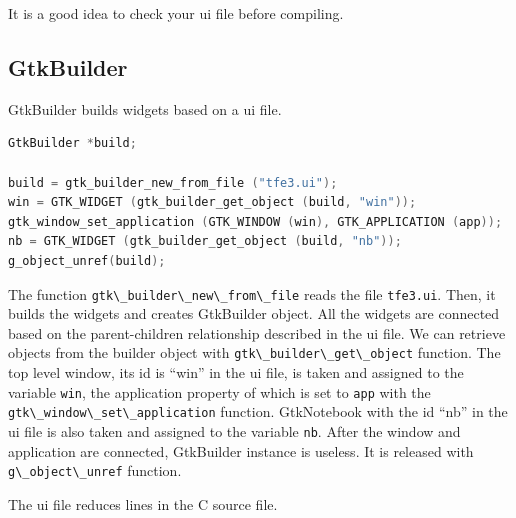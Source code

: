 It is a good idea to check your ui file before compiling.

\subsection{GtkBuilder}\label{gtkbuilder}

GtkBuilder builds widgets based on a ui file.

\begin{lstlisting}[language=C]
GtkBuilder *build;

build = gtk_builder_new_from_file ("tfe3.ui");
win = GTK_WIDGET (gtk_builder_get_object (build, "win"));
gtk_window_set_application (GTK_WINDOW (win), GTK_APPLICATION (app));
nb = GTK_WIDGET (gtk_builder_get_object (build, "nb"));
g_object_unref(build);
\end{lstlisting}

The function \passthrough{\lstinline!gtk\_builder\_new\_from\_file!}
reads the file \passthrough{\lstinline!tfe3.ui!}. Then, it builds the
widgets and creates GtkBuilder object. All the widgets are connected
based on the parent-children relationship described in the ui file. We
can retrieve objects from the builder object with
\passthrough{\lstinline!gtk\_builder\_get\_object!} function. The top
level window, its id is ``win'' in the ui file, is taken and assigned to
the variable \passthrough{\lstinline!win!}, the application property of
which is set to \passthrough{\lstinline!app!} with the
\passthrough{\lstinline!gtk\_window\_set\_application!} function.
GtkNotebook with the id ``nb'' in the ui file is also taken and assigned
to the variable \passthrough{\lstinline!nb!}. After the window and
application are connected, GtkBuilder instance is useless. It is
released with \passthrough{\lstinline!g\_object\_unref!} function.

The ui file reduces lines in the C source file.

